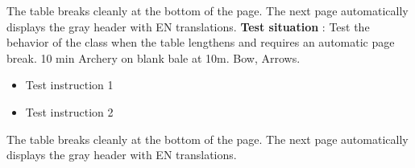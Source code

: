 \documentclass{../tex/ficheseance}
\begin{document}
\begin{tableauSeance}
{\begin{itemize}
		\end{itemize}}
		{The table breaks cleanly at the bottom of the page.}
		{The next page automatically displays the gray header with EN translations.}		
		\ligneSeance
		{\textbf{Test situation} : Test the behavior of the class when the table lengthens and requires an automatic page break.}
		{10 min}
		{Archery on blank bale at 10m.}
		{Bow, Arrows.}
		{\begin{itemize}
			\item Test instruction 1
			\item Test instruction 2
		\end{itemize}}
		{The table breaks cleanly at the bottom of the page.}
		{The next page automatically displays the gray header with EN translations.}		
	\end{tableauSeance}
	
\end{document}
